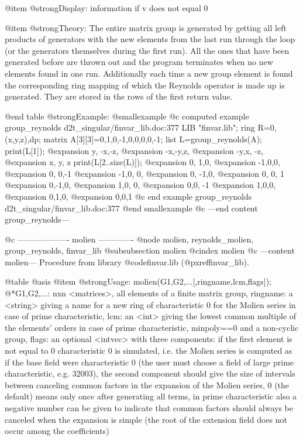 @item @strong{Display:}
information if v does not equal 0

@item @strong{Theory:}
The entire matrix group is generated by getting all left products of
generators with the new elements from the last run through the loop
(or the generators themselves during the first run). All the ones that
have been generated before are thrown out and the program terminates
when no new elements found in one run. Additionally each time a new
group element is found the corresponding ring mapping of which the
Reynolds operator is made up is generated. They are stored in the rows
of the first return value.

@end table
@strong{Example:}
@smallexample
@c computed example group_reynolds d2t_singular/finvar_lib.doc:377 
LIB "finvar.lib";
ring R=0,(x,y,z),dp;
matrix A[3][3]=0,1,0,-1,0,0,0,0,-1;
list L=group_reynolds(A);
print(L[1]);
@expansion{} y, -x,-z,
@expansion{} -x,-y,z, 
@expansion{} -y,x, -z,
@expansion{} x, y, z  
print(L[2..size(L)]);
@expansion{} 0, 1,0,
@expansion{} -1,0,0,
@expansion{} 0, 0,-1
@expansion{} -1,0, 0,
@expansion{} 0, -1,0,
@expansion{} 0, 0, 1 
@expansion{} 0,-1,0,
@expansion{} 1,0, 0,
@expansion{} 0,0, -1
@expansion{} 1,0,0,
@expansion{} 0,1,0,
@expansion{} 0,0,1 
@c end example group_reynolds d2t_singular/finvar_lib.doc:377
@end smallexample
@c ---end content group_reynolds---

@c ------------------- molien -------------
@node molien, reynolds_molien, group_reynolds, finvar_lib
@subsubsection molien
@cindex molien
@c ---content molien---
Procedure from library @code{finvar.lib} (@pxref{finvar_lib}).

@table @asis
@item @strong{Usage:}
molien(G1,G2,...[,ringname,lcm,flags]);
@*G1,G2,...: nxn <matrices>, all elements of a finite matrix group,
ringname: a <string> giving a name for a new ring of characteristic 0
for the Molien series in case of prime characteristic, lcm: an <int>
giving the lowest common multiple of the elements' orders in case of
prime characteristic, minpoly==0 and a non-cyclic group, flags: an
optional <intvec> with three components: if the first element is not
equal to 0 characteristic 0 is simulated, i.e. the Molien series is
computed as if the base field were characteristic 0 (the user must
choose a field of large prime characteristic, e.g. 32003), the second
component should give the size of intervals between canceling common
factors in the expansion of the Molien series, 0 (the default) means
only once after generating all terms, in prime characteristic also a
negative number can be given to indicate that common factors should
always be canceled when the expansion is simple (the root of the
extension field does not occur among the coefficients)

